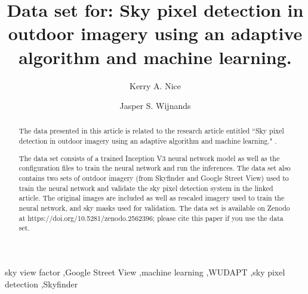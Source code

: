 \documentclass[final,3p,times,authoryear]{elsarticle}
\begin{document}
\begin{frontmatter}



\title{Data set for: Sky pixel detection in outdoor imagery using an adaptive algorithm and machine learning.} 

\author[melb]{Kerry A. Nice}
\author[melb]{Jasper S. Wijnands}
\address[melb]{Transport, Health and Urban Design, Melbourne School of Design, The University of Melbourne, Parkville VIC 3010, Australia}





\begin{abstract}

The data presented in this article is related to the research article entitled ``Sky pixel detection in outdoor imagery using an adaptive algorithm and machine learning." \citep{Nice2019UC}. 

The data set consists of a trained Inception V3 neural network model as well as the configuration files to train the neural network and run the inferences. The data set also contains two sets of outdoor imagery (from Skyfinder and Google Street View) used to train the neural network and validate the sky pixel detection system in the linked article. The original images are included as well as rescaled imagery used to train the neural network, and sky masks used for validation. The data set is available on Zenodo at https://doi.org/10.5281/zenodo.2562396;  please cite this paper if you use the data set.


\end{abstract}

\begin{keyword}
sky view factor \sep Google Street View \sep machine learning \sep WUDAPT \sep sky pixel detection \sep Skyfinder
\end{keyword}

\end{frontmatter}
\end{document}
